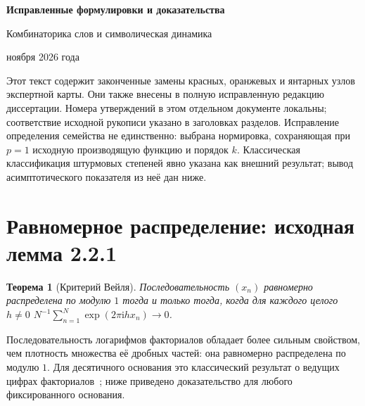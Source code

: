 \documentclass[12pt,a4paper]{article}
\newtheorem{theorem}{Теорема}[section]
\begin{document}
\begin{center}
{\LARGE\bfseries Исправленные формулировки и доказательства\par}
\medskip
{\large Комбинаторика слов и символическая динамика\par}
 ноября 2026 года
\end{center}
Этот текст содержит законченные замены красных, оранжевых и янтарных
узлов экспертной карты. Они также внесены в полную исправленную
редакцию диссертации. Номера утверждений в этом отдельном документе
локальны; соответствие исходной рукописи указано в заголовках разделов.
Исправление определения семейства не единственно: выбрана нормировка,
сохраняющая при $p=1$ исходную производящую функцию и порядок $k$.
Классическая классификация штурмовых степеней явно указана как
внешний результат; вывод асимптотического показателя из неё дан ниже.
\section{Равномерное распределение: исходная лемма 2.2.1}
\begin{theorem}[Критерий Вейля]
Последовательность $(x_n)$ равномерно распределена по модулю $1$
тогда и только тогда, когда для каждого целого $h\ne0$
$N^{-1}\sum_{n=1}^N\exp(2\pi\mathrm i h x_n)\to0$.
\end{theorem}
Последовательность логарифмов факториалов обладает более сильным
свойством, чем плотность множества её дробных частей: она равномерно
распределена по модулю $1$. Для десятичного основания это классический
результат о ведущих цифрах факториалов~\cite{Diaconis1977};
ниже приведено доказательство для любого фиксированного основания.
\end{document}

